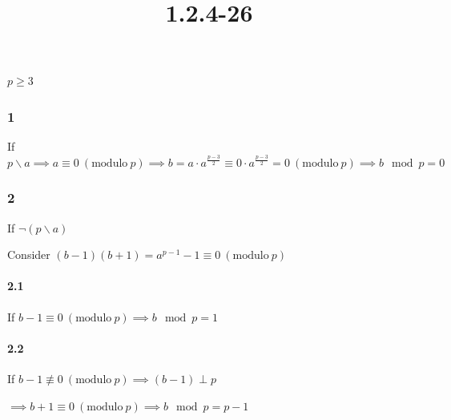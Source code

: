 \documentclass{article}
\title{1.2.4-26}
\begin{document}
\maketitle

$p \geq 3$

\subsubsection*{1}

If $p \backslash a \implies a \equiv 0\ (\mathrm{modulo}\ p) \implies b = a \cdot a^{\frac{p-3}{2}} \equiv 0 \cdot a^{\frac{p-3}{2}} = 0 \ (\mathrm{modulo}\ p) \implies b \mod p = 0$

\subsubsection*{2}

If $\lnot(p \backslash a)$

Consider $(b-1)(b+1)=a^{p-1}-1 \equiv 0\ (\mathrm{modulo}\ p)$

\paragraph*{2.1}

If $b - 1 \equiv 0\ (\mathrm{modulo}\ p) \implies b \mod p = 1$

\paragraph*{2.2}

If $b - 1 \not\equiv 0\ (\mathrm{modulo}\ p) \implies (b - 1) \perp p$

$\implies b + 1 \equiv 0\ (\mathrm{modulo}\ p) \implies b \mod p = p - 1$
\end{document}
